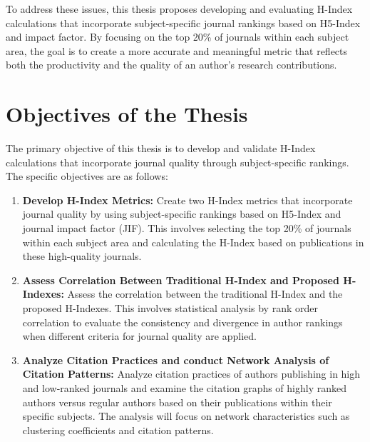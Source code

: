 To address these issues, this thesis proposes developing and evaluating H-Index
calculations that incorporate subject-specific journal rankings based on
H5-Index and impact factor. By focusing on the top 20\% of journals within each
subject area, the goal is to create a more accurate and meaningful metric that
reflects both the productivity and the quality of an author's research
contributions.

\section{Objectives of the Thesis}
The primary objective of this thesis is to develop and validate H-Index
calculations that incorporate journal quality through subject-specific
rankings. The specific objectives are as follows:
\begin{enumerate}
      \item \textbf{Develop H-Index Metrics:} Create two H-Index metrics that incorporate journal quality
            by using subject-specific rankings based on H5-Index and journal impact factor (JIF).
            This involves selecting the top 20\% of journals within each subject area and calculating the H-Index based on publications
            in these high-quality journals.
      \item \textbf{Assess Correlation Between Traditional H-Index and Proposed H-Indexes:} Assess the correlation between the traditional H-Index
            and the proposed H-Indexes. This involves statistical analysis by rank order correlation
            to evaluate the consistency and divergence in author rankings when different criteria for journal quality are applied.
      \item \textbf{Analyze Citation Practices and conduct Network Analysis of Citation Patterns:} Analyze citation practices of authors publishing in high and low-ranked journals
            and examine the citation graphs of highly ranked authors versus regular authors based on their publications within their specific subjects. The analysis will focus on network characteristics such as
            clustering coefficients and citation patterns. %

\end{enumerate}
